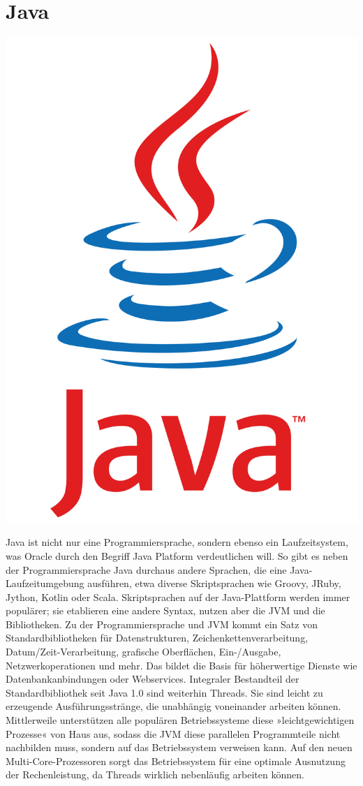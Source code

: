 \section{Java}
\includegraphics[scale=0.015]{pics/logos/javaLogo.png}

Java ist nicht nur eine Programmiersprache, sondern ebenso ein Laufzeitsystem, was Oracle durch den Begriff Java Platform verdeutlichen will. 
So gibt es neben der Programmiersprache Java durchaus andere Sprachen, die eine Java-Laufzeitumgebung ausführen, etwa diverse Skriptsprachen wie 
Groovy, JRuby, Jython, Kotlin oder Scala. Skriptsprachen auf der Java-Plattform werden immer populärer; sie etablieren eine andere Syntax, nutzen aber die JVM und die Bibliotheken.
Zu der Programmiersprache und JVM kommt ein Satz von Standardbibliotheken für Datenstrukturen, Zeichenkettenverarbeitung, Datum/Zeit-Verarbeitung, grafische Oberflächen, 
Ein-/Ausgabe, Netzwerkoperationen und mehr. Das bildet die Basis für höherwertige Dienste wie Datenbankanbindungen oder Webservices. Integraler Bestandteil der Standardbibliothek 
seit Java 1.0 sind weiterhin Threads. Sie sind leicht zu erzeugende Ausführungsstränge, die unabhängig voneinander arbeiten können. 
Mittlerweile unterstützen alle populären Betriebssysteme diese »leichtgewichtigen Prozesse« von Haus aus, sodass die JVM diese parallelen Programmteile nicht nachbilden muss, 
sondern auf das Betriebssystem verweisen kann. Auf den neuen Multi-Core-Prozessoren sorgt das Betriebssystem für eine optimale Ausnutzung der Rechenleistung, da Threads wirklich nebenläufig arbeiten können.
\cite{sysarch-java-1}

